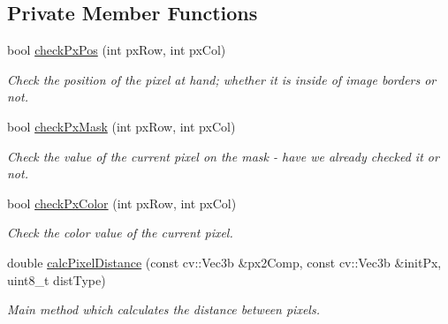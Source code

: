 \subsection*{Private Member Functions}
\begin{DoxyCompactItemize}
\item 
bool \mbox{\hyperlink{class_converter_a16df47c8a58a1c7b3818c9a2520e3a4b}{check\+Px\+Pos}} (int px\+Row, int px\+Col)
\begin{DoxyCompactList}\small\item\em Check the position of the pixel at hand; whether it is inside of image borders or not. \end{DoxyCompactList}\item 
bool \mbox{\hyperlink{class_converter_ab13b0858bbf310073492f77dc7be48b0}{check\+Px\+Mask}} (int px\+Row, int px\+Col)
\begin{DoxyCompactList}\small\item\em Check the value of the current pixel on the mask -\/ have we already checked it or not. \end{DoxyCompactList}\item 
bool \mbox{\hyperlink{class_converter_a29aedc9ca721def180a994abd6d299a4}{check\+Px\+Color}} (int px\+Row, int px\+Col)
\begin{DoxyCompactList}\small\item\em Check the color value of the current pixel. \end{DoxyCompactList}\item 
double \mbox{\hyperlink{class_converter_aa5b0afd52a0319cb627360032a98bf80}{calc\+Pixel\+Distance}} (const cv\+::\+Vec3b \&px2\+Comp, const cv\+::\+Vec3b \&init\+Px, uint8\+\_\+t dist\+Type)
\begin{DoxyCompactList}\small\item\em Main method which calculates the distance between pixels. \end{DoxyCompactList}\end{DoxyCompactItemize}
